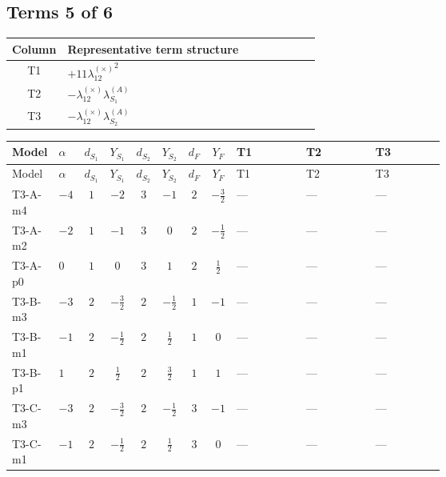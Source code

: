 \documentclass[8pt]{article}
\begin{document}
\begin{landscape}
\subsection*{Terms 5 of 6}
\begin{center}
\begin{tabular}{@{}c >{\raggedright\arraybackslash}p{0.82\linewidth}@{}}
\toprule
Column & Representative term structure \\
\midrule
T1 & \(\displaystyle +11 {\lambda_{12}^{(\times)}}^2\) \\
\midrule
T2 & \(\displaystyle -{\lambda_{12}^{(\times)}} {\lambda_{S_1}^{(A)}}\) \\
\midrule
T3 & \(\displaystyle -{\lambda_{12}^{(\times)}} {\lambda_{S_2}^{(A)}}\) \\
\midrule
\bottomrule
\end{tabular}
\end{center}
\smallskip
\tiny
\begin{longtable}{@{}llcccccc >{\raggedright\arraybackslash}p{0.21\linewidth} >{\raggedright\arraybackslash}p{0.21\linewidth} >{\raggedright\arraybackslash}p{0.21\linewidth}@{}}
\toprule
Model & $\alpha$ & $d_{S_1}$ & $Y_{S_1}$ & $d_{S_2}$ & $Y_{S_2}$ & $d_F$ & $Y_F$ & T1 & T2 & T3 \\
\midrule
\endfirsthead
\toprule
Model & $\alpha$ & $d_{S_1}$ & $Y_{S_1}$ & $d_{S_2}$ & $Y_{S_2}$ & $d_F$ & $Y_F$ & T1 & T2 & T3 \\
\midrule
\endhead
T3-A-m4 & $-4$ & $1$ & $-2$ & $3$ & $-1$ & $2$ & $-\frac{3}{2}$ & --- & --- & --- \\
\midrule
T3-A-m2 & $-2$ & $1$ & $-1$ & $3$ & $0$ & $2$ & $-\frac{1}{2}$ & --- & --- & --- \\
\midrule
T3-A-p0 & $0$ & $1$ & $0$ & $3$ & $1$ & $2$ & $\frac{1}{2}$ & --- & --- & --- \\
\midrule
T3-B-m3 & $-3$ & $2$ & $-\frac{3}{2}$ & $2$ & $-\frac{1}{2}$ & $1$ & $-1$ & --- & --- & --- \\
\midrule
T3-B-m1 & $-1$ & $2$ & $-\frac{1}{2}$ & $2$ & $\frac{1}{2}$ & $1$ & $0$ & --- & --- & --- \\
\midrule
T3-B-p1 & $1$ & $2$ & $\frac{1}{2}$ & $2$ & $\frac{3}{2}$ & $1$ & $1$ & --- & --- & --- \\
\midrule
T3-C-m3 & $-3$ & $2$ & $-\frac{3}{2}$ & $2$ & $-\frac{1}{2}$ & $3$ & $-1$ & --- & --- & --- \\
\midrule
T3-C-m1 & $-1$ & $2$ & $-\frac{1}{2}$ & $2$ & $\frac{1}{2}$ & $3$ & $0$ & --- & --- & --- \\

\end{longtable}
\end{landscape}
\end{document}
